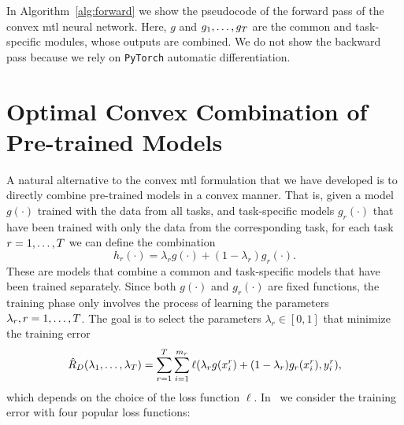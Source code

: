 {In Algorithm~\ref{alg:forward} we show the pseudocode of the forward pass of the convex \acrshort{mtl} neural network. Here, $g$ and $g_1, \ldots, g_T$ are the common and task-specific modules, whose outputs are combined. We do not show the backward pass because we rely on \texttt{PyTorch} automatic differentiation.}



















\section{Optimal Convex Combination of Pre-trained Models}\label{sec:optimal_comb}
A natural alternative to the convex \acrshort{mtl} formulation that we have developed is to directly combine pre-trained models in a convex manner. That is, given a model $g(\cdot)$ trained with the data from all tasks, and task-specific models $g_r(\cdot)$ that have been trained with only the data from the corresponding task, for each task $r=1,\ldots,T$ we can define the combination
\begin{equation}
    \nonumber
    h_r(\cdot) = \lambda_r g(\cdot) + (1 - \lambda_r) g_r(\cdot) .
\end{equation}
These are models that combine a common and task-specific models that have been trained separately. Since both $g(\cdot)$ and $g_r(\cdot)$ are fixed functions, the training phase only involves the process of learning the parameters $\lambda_r, r=1, \ldots, T$. The goal is to select the parameters $\lambda_r \in [0, 1]$ that minimize the training error
\begin{equation}
    \nonumber
    \hat{R}_{D}(\lambda_1, \ldots, \lambda_T) = \sum_{r=1}^T \sum_{i=1}^{m_r} \ell(\lambda_r g(x_i^r) + (1 - \lambda_r) g_r(x_i^r), y_i^r) ,
\end{equation}
which depends on the choice of the loss function $\ell$. 
In~\cite{RuizAD21} we consider the training error with four popular loss functions:

